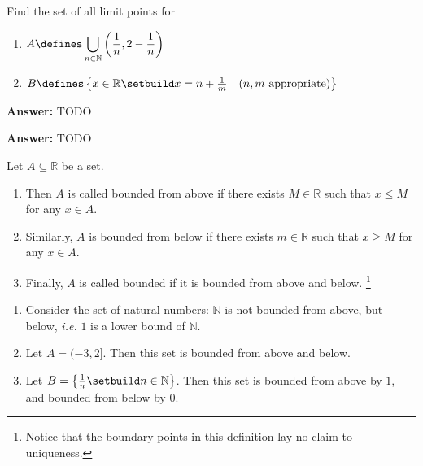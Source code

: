 \begin{exm}\label{exm-limit-points}
    Find the set of all limit points for
    \begin{enumerate}
        \item $A\defines\displaystyle\bigcup_{n\in\mathbb{N}}\left(\frac{1}{n},2-\frac{1}{n}\right)$
        \item $B\defines\left\{x\in\mathbb{R}\setbuild x=n+\frac{1}{m}\quad\text{($n,m$ appropriate)}\right\}$
    \end{enumerate}
    \begin{flushleft}
        \textbf{ Answer:} TODO
    \end{flushleft}
    \begin{flushleft}
        \textbf{ Answer:} TODO
    \end{flushleft}
\end{exm}

\begin{definition}\label{def-bounded-sets}
    Let $A \subseteq\mathbb{R}$ be a set.
    \begin{enumerate}
        \item Then $A$ is called bounded from above if there exists $M\in\mathbb{R}$ 
        such that $x\leq M$ for any $x\in A$.
        \item Similarly, $A$ is bounded from below if there exists $m\in\mathbb{R}$ 
        such that $x\geq M$ for any $x\in A$.
        \item Finally, $A$ is called bounded if it is bounded from above and below.
        \footnote{Notice that the boundary points in this definition
        lay no claim to uniqueness.}
    \end{enumerate}
\end{definition}

\begin{exm}\label{exm-bounded-sets:1}
    \hfill
    \begin{enumerate}
        \item Consider the set of natural numbers: $\mathbb{N}$ is not bounded from above, but 
        below, \textit{i.e.} $1$ is a lower bound of $\mathbb{N}$.
        \item Let $A=(-3,2]$. Then this set is bounded from above and below.
        \item Let $B=\left\{\frac{1}{n}\setbuild n\in\mathbb{N}\right\}$. Then this
        set is bounded from above by $1$, and bounded from below by $0$.
    \end{enumerate}
\end{exm}

